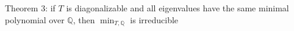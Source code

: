 \documentclass[preview]{standalone}
\begin{document}
\begin{center}
Theorem 3: if $T$ is diagonalizable and all eigenvalues have the same minimal polynomial over $\mathbb{Q}$, then $\min_{T, \mathbb{Q}}$ is irreducible
\end{center}
\end{document}
